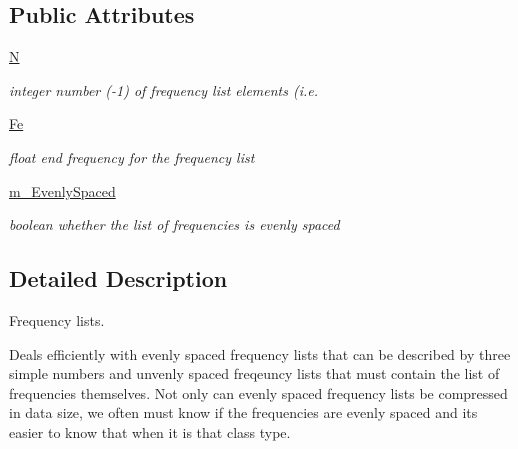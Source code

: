\subsection*{Public Attributes}
\begin{DoxyCompactItemize}
\item 
\hyperlink{classSignalIntegrity_1_1FrequencyDomain_1_1FrequencyList_1_1FrequencyList_a8cc2e7240164328fdc3f0e5e21032c56}{N}
\begin{DoxyCompactList}\small\item\em integer number (-\/1) of frequency list elements (i.\+e. \end{DoxyCompactList}\item 
\mbox{\label{classSignalIntegrity_1_1FrequencyDomain_1_1FrequencyList_1_1FrequencyList_a7313483ea19e09cf50b8b58d531b871d}} 
\hyperlink{classSignalIntegrity_1_1FrequencyDomain_1_1FrequencyList_1_1FrequencyList_a7313483ea19e09cf50b8b58d531b871d}{Fe}
\begin{DoxyCompactList}\small\item\em float end frequency for the frequency list \end{DoxyCompactList}\item 
\mbox{\label{classSignalIntegrity_1_1FrequencyDomain_1_1FrequencyList_1_1FrequencyList_a2d85a36e030819ea57fb06cdb76e90c4}} 
\hyperlink{classSignalIntegrity_1_1FrequencyDomain_1_1FrequencyList_1_1FrequencyList_a2d85a36e030819ea57fb06cdb76e90c4}{m\+\_\+\+Evenly\+Spaced}
\begin{DoxyCompactList}\small\item\em boolean whether the list of frequencies is evenly spaced \end{DoxyCompactList}\end{DoxyCompactItemize}


\subsection{Detailed Description}
Frequency lists. 

Deals efficiently with evenly spaced frequency lists that can be described by three simple numbers and unvenly spaced freqeuncy lists that must contain the list of frequencies themselves. Not only can evenly spaced frequency lists be compressed in data size, we often must know if the frequencies are evenly spaced and it\textquotesingle{}s easier to know that when it is that class type.

